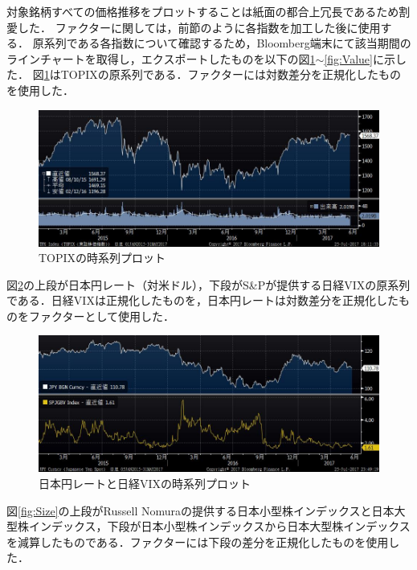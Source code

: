\documentclass[11pt]{jreport}
\begin{document}
対象銘柄すべての価格推移をプロットすることは紙面の都合上冗長であるため割愛した．
ファクターに関しては，前節のように各指数を加工した後に使用する．
原系列である各指数について確認するため，Bloomberg端末にて該当期間のラインチャートを取得し，エクスポートしたものを以下の図\ref{fig:TOPIX}$\sim$\ref{fig:Value}に示した．
図\ref{fig:TOPIX}はTOPIXの原系列である．ファクターには対数差分を正規化したものを使用した．
\begin{figure}[H]
	\begin{center}
		\includegraphics[width=15cm]{./fig/TOPIX.jpg}
		\caption{TOPIXの時系列プロット}
		\label{fig:TOPIX}
	\end{center}
\end{figure}
図\ref{fig:VIX_JPY}の上段が日本円レート（対米ドル），下段がS\&Pが提供する日経VIXの原系列である．日経VIXは正規化したものを，日本円レートは対数差分を正規化したものをファクターとして使用した．
\begin{figure}[H]
	\begin{center}
		\includegraphics[width=15cm]{./fig/VIX_JPY.jpg}
		\caption{日本円レートと日経VIXの時系列プロット}
		\label{fig:VIX_JPY}
	\end{center}
\end{figure}
図\ref{fig:Size}の上段がRussell Nomuraの提供する日本小型株インデックスと日本大型株インデックス，下段が日本小型株インデックスから日本大型株インデックスを減算したものである．ファクターには下段の差分を正規化したものを使用した．
\end{document}
